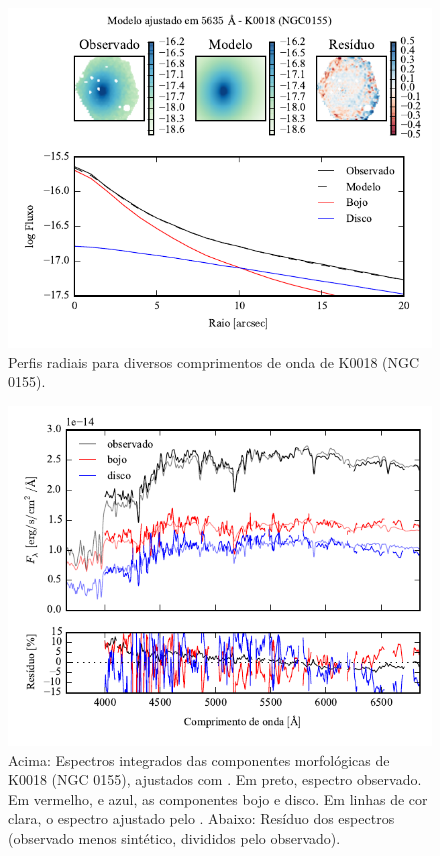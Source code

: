 \begin{figure}
	\includegraphics[page=5]{figuras-decomp/K0018_sample006a}
	\caption[Perfis radiais para diversos comprimentos de onda de K0018 (NGC 0155)]
	{Perfis radiais para diversos comprimentos de onda de K0018 (NGC 0155).}
	\label{fig:decompRadprofSpec:K0018}
\end{figure}

\begin{figure}
	\includegraphics[page=1]{figuras/sample006a_synthesis}
	\caption[Espectros ajustados com \starlight das componentes morfológicas de
	K0018 (NGC 0155)]
	{Acima: Espectros integrados das componentes morfológicas de
	K0018 (NGC 0155), ajustados com \starlight. Em preto, espectro observado. Em
	vermelho, e azul, as componentes bojo e disco. Em linhas de cor clara, o
	espectro ajustado pelo \starlight. Abaixo: Resíduo dos espectros (observado
	menos sintético, divididos pelo observado).}
	\label{fig:decompSintese:K0018}
\end{figure}

